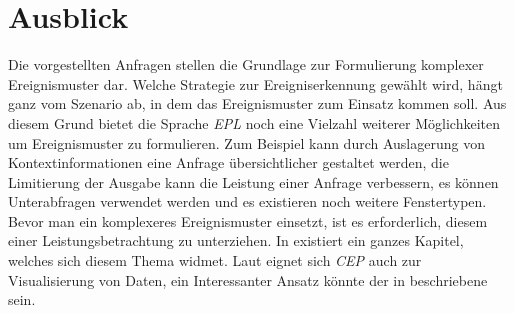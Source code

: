 \documentclass{acm_proc_article-sp}
\begin{document}
\section{Ausblick}
\vspace{0.1cm}
Die vorgestellten Anfragen stellen die Grundlage zur Formulierung komplexer 
Ereignismuster dar. Welche Strategie zur Ereigniserkennung gewählt wird, hängt ganz vom 
Szenario ab, in dem das Ereignismuster zum Einsatz kommen soll. Aus diesem Grund bietet 
die Sprache \textit{EPL} noch eine Vielzahl weiterer Möglichkeiten um Ereignismuster zu 
formulieren. Zum Beispiel kann durch Auslagerung von Kontextinformationen eine Anfrage 
übersichtlicher gestaltet werden, die Limitierung der Ausgabe kann die Leistung einer 
Anfrage verbessern, es können Unterabfragen verwendet werden und es existieren noch 
weitere Fenstertypen.\\
Bevor man ein komplexeres Ereignismuster einsetzt, ist es erforderlich, diesem einer 
Leistungsbetrachtung zu unterziehen. In \cite{esper-reference} existiert ein ganzes 
Kapitel, welches sich diesem Thema widmet. Laut \cite{eckert} eignet sich \textit{CEP} 
auch zur Visualisierung von Daten, ein Interessanter Ansatz könnte der in \cite{perry} 
beschriebene sein.


\appendix
\vspace{0.1cm}
%

%
%

\end{document}
